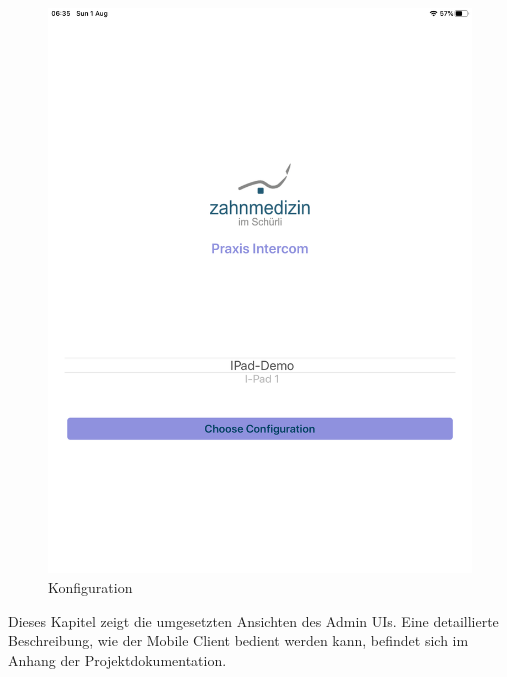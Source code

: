 \begin{figure}[h]
\begin{minipage}[b]{0.4\textwidth}
        \includegraphics[width=\textwidth]{graphics/screenshots/mobileclient/screenshot-select-config}
        \caption{Konfiguration}
    \end{minipage}
    \label{fig:MobileClient-Screens1}
\end{figure}

\clearpage

Dieses Kapitel zeigt die umgesetzten Ansichten des Admin UIs.
Eine detaillierte Beschreibung, wie der Mobile Client bedient werden kann, befindet sich im Anhang der Projektdokumentation.

